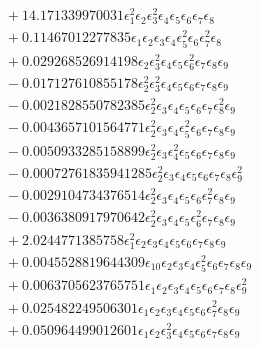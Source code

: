 \documentclass[10pt]{article}
\begin{document}
\begin{align*}
&{}  + 14.171339970031 \epsilon_{1}^{2} \epsilon_{2} \epsilon_{3}^{2} \epsilon_{4} \epsilon_{5} \epsilon_{6} \epsilon_{7} \epsilon_{8} \\
&{}  + 0.11467012277835 \epsilon_{1} \epsilon_{2} \epsilon_{3} \epsilon_{4} \epsilon_{5}^{2} \epsilon_{6} \epsilon_{7}^{2} \epsilon_{8} \\
&{}  + 0.029268526914198 \epsilon_{2} \epsilon_{3}^{2} \epsilon_{4} \epsilon_{5} \epsilon_{6}^{2} \epsilon_{7} \epsilon_{8} \epsilon_{9} \\
&{}  - 0.017127610855178 \epsilon_{2}^{2} \epsilon_{3}^{2} \epsilon_{4} \epsilon_{5} \epsilon_{6} \epsilon_{7} \epsilon_{8} \epsilon_{9} \\
&{}  - 0.0021828550782385 \epsilon_{2}^{2} \epsilon_{3} \epsilon_{4} \epsilon_{5} \epsilon_{6} \epsilon_{7} \epsilon_{8}^{2} \epsilon_{9} \\
&{}  - 0.0043657101564771 \epsilon_{2}^{2} \epsilon_{3} \epsilon_{4} \epsilon_{5}^{2} \epsilon_{6} \epsilon_{7} \epsilon_{8} \epsilon_{9} \\
&{}  - 0.0050933285158899 \epsilon_{2}^{2} \epsilon_{3} \epsilon_{4}^{2} \epsilon_{5} \epsilon_{6} \epsilon_{7} \epsilon_{8} \epsilon_{9} \\
&{}  - 0.00072761835941285 \epsilon_{2}^{2} \epsilon_{3} \epsilon_{4} \epsilon_{5} \epsilon_{6} \epsilon_{7} \epsilon_{8} \epsilon_{9}^{2} \\
&{}  - 0.0029104734376514 \epsilon_{2}^{2} \epsilon_{3} \epsilon_{4} \epsilon_{5} \epsilon_{6} \epsilon_{7}^{2} \epsilon_{8} \epsilon_{9} \\
&{}  - 0.0036380917970642 \epsilon_{2}^{2} \epsilon_{3} \epsilon_{4} \epsilon_{5} \epsilon_{6}^{2} \epsilon_{7} \epsilon_{8} \epsilon_{9} \\
&{}  + 2.0244771385758 \epsilon_{1}^{2} \epsilon_{2} \epsilon_{3} \epsilon_{4} \epsilon_{5} \epsilon_{6} \epsilon_{7} \epsilon_{8} \epsilon_{9} \\
&{}  + 0.0045528819644309 \epsilon_{10} \epsilon_{2} \epsilon_{3} \epsilon_{4} \epsilon_{5}^{2} \epsilon_{6} \epsilon_{7} \epsilon_{8} \epsilon_{9} \\
&{}  + 0.0063705623765751 \epsilon_{1} \epsilon_{2} \epsilon_{3} \epsilon_{4} \epsilon_{5} \epsilon_{6} \epsilon_{7} \epsilon_{8} \epsilon_{9}^{2} \\
&{}  + 0.025482249506301 \epsilon_{1} \epsilon_{2} \epsilon_{3} \epsilon_{4} \epsilon_{5} \epsilon_{6} \epsilon_{7}^{2} \epsilon_{8} \epsilon_{9} \\
&{}  + 0.050964499012601 \epsilon_{1} \epsilon_{2} \epsilon_{3}^{2} \epsilon_{4} \epsilon_{5} \epsilon_{6} \epsilon_{7} \epsilon_{8} \epsilon_{9} \\

\end{align*}
\end{document}
